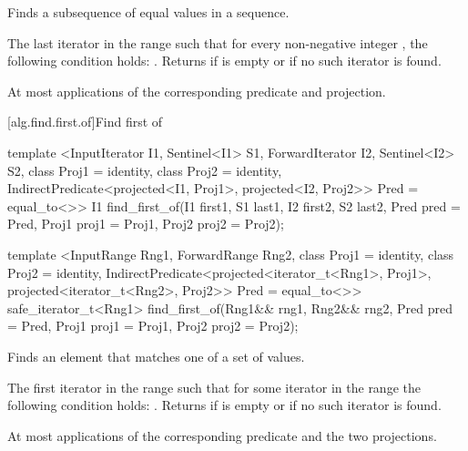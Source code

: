 \begin{itemdescr}
\pnum
\effects
Finds a subsequence of equal values in a sequence.

\pnum
\returns
The last iterator
in the range 
such that for every non-negative integer
,
the following condition holds:
.
Returns 
if
 is empty or if
no such iterator is found.

\pnum
\complexity
At most
applications of the corresponding predicate and projection.
\end{itemdescr}

[alg.find.first.of]{Find first of}

%
\begin{itemdecl}
template <InputIterator I1, Sentinel<I1> S1, ForwardIterator I2, Sentinel<I2> S2,
    class Proj1 = identity, class Proj2 = identity,
    IndirectPredicate<projected<I1, Proj1>, projected<I2, Proj2>> Pred = equal_to<>>
  I1
    find_first_of(I1 first1, S1 last1, I2 first2, S2 last2, Pred pred = Pred{},
                  Proj1 proj1 = Proj1{}, Proj2 proj2 = Proj2{});

template <InputRange Rng1, ForwardRange Rng2, class Proj1 = identity,
    class Proj2 = identity,
    IndirectPredicate<projected<iterator_t<Rng1>, Proj1>,
      projected<iterator_t<Rng2>, Proj2>> Pred = equal_to<>>
  safe_iterator_t<Rng1>
    find_first_of(Rng1&& rng1, Rng2&& rng2, Pred pred = Pred{},
                  Proj1 proj1 = Proj1{}, Proj2 proj2 = Proj2{});
\end{itemdecl}

\begin{itemdescr}
\pnum
\effects
Finds an element that matches one of a set of values.

\pnum
\returns
The first iterator
in the range 
such that for some
iterator
in the range 
the following condition holds:
.
Returns 
if  is empty or if
no such iterator is found.

\pnum
\complexity
At most
applications of the corresponding predicate and the two projections.
\end{itemdescr}

